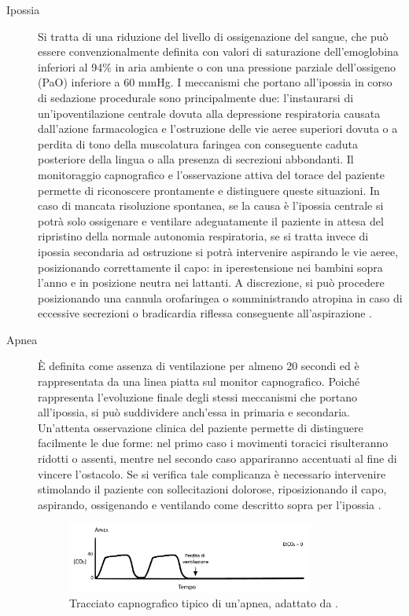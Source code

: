 \newpage

\begin{description}
\item[Ipossia] Si tratta di una riduzione del livello di ossigenazione del sangue, che può essere convenzionalmente definita con valori di saturazione dell'emoglobina inferiori al 94$\%$ in aria ambiente o con una pressione parziale dell'ossigeno (PaO) inferiore a 60 mmHg. I meccanismi che portano all'ipossia in corso di sedazione procedurale sono principalmente due: l'instaurarsi di un'ipoventilazione centrale dovuta alla depressione respiratoria causata dall'azione farmacologica e l'ostruzione delle vie aeree superiori dovuta o a perdita di tono della muscolatura faringea con conseguente caduta posteriore della lingua o alla presenza di secrezioni abbondanti. Il monitoraggio capnografico e l'osservazione attiva del torace del paziente permette di riconoscere prontamente e distinguere queste situazioni. In caso di mancata risoluzione spontanea, se la causa è l'ipossia centrale si potrà solo ossigenare e ventilare adeguatamente il paziente in attesa del ripristino della normale autonomia respiratoria, se si tratta invece di ipossia secondaria ad ostruzione si potrà intervenire aspirando le vie aeree, posizionando correttamente il capo: in iperestensione nei bambini sopra l'anno e in posizione neutra nei lattanti. A discrezione, si può procedere posizionando una cannula orofaringea o somministrando atropina in caso di eccessive secrezioni o bradicardia riflessa conseguente all'aspirazione \cite{Simeupsedazione}. 

\item[Apnea] \`E definita come assenza di ventilazione per almeno 20 secondi ed è rappresentata da una linea piatta sul monitor capnografico. Poiché rappresenta l'evoluzione finale degli stessi meccanismi che portano all'ipossia, si può suddividere anch'essa in primaria e secondaria. Un'attenta osservazione clinica del paziente permette di distinguere facilmente le due forme: nel primo caso i movimenti toracici risulteranno ridotti o assenti, mentre nel secondo caso appariranno accentuati al fine di vincere l'ostacolo. Se si verifica tale complicanza è necessario intervenire stimolando il paziente con sollecitazioni dolorose, riposizionando il capo, aspirando, ossigenando e ventilando come descritto sopra per l'ipossia \cite{Simeupsedazione}. 

\begin{figure}[h]
    \centering
    \includegraphics[width=0.8\textwidth]{Figure/apnea.pdf}
    \caption{Tracciato capnografico tipico di un'apnea, adattato da \cite{Baruch2005}.}
    \label{fig:apnea}
\end{figure}



\end{description}
